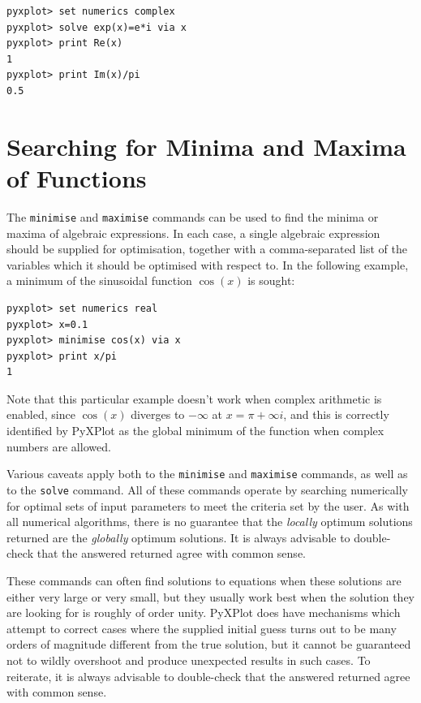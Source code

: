 \begin{verbatim}
pyxplot> set numerics complex
pyxplot> solve exp(x)=e*i via x
pyxplot> print Re(x)
1
pyxplot> print Im(x)/pi
0.5
\end{verbatim}

\section{Searching for Minima and Maxima of Functions}

The  {\tt minimise} and {\tt maximise}
commands can be used to find the minima or maxima of algebraic expressions. In
each case, a single algebraic expression should be supplied for optimisation,
together with a comma-separated list of the variables which it should be
optimised with respect to. In the following example, a minimum of the
sinusoidal function $\cos(x)$ is sought:

\begin{verbatim}
pyxplot> set numerics real
pyxplot> x=0.1
pyxplot> minimise cos(x) via x
pyxplot> print x/pi
1
\end{verbatim}

\noindent Note that this particular example doesn't work when complex
arithmetic is enabled, since $\cos(x)$ diverges to $-\infty$ at $x=\pi+\infty
i$, and this is correctly identified by PyXPlot as the global minimum of the
function when complex numbers are allowed.

Various caveats apply both to the {\tt minimise} and {\tt maximise} commands,
as well as to the {\tt solve} command.  All of these commands operate by
searching numerically for optimal sets of input parameters to meet the criteria
set by the user. As with all numerical algorithms, there is no guarantee that
the {\it locally} optimum solutions returned are the {\it globally} optimum
solutions. It is always advisable to double-check that the answered returned
agree with common sense.

These commands can often find solutions to equations when these solutions are
either very large or very small, but they usually work best when the solution
they are looking for is roughly of order unity.  PyXPlot does have mechanisms
which attempt to correct cases where the supplied initial guess turns out to be
many orders of magnitude different from the true solution, but it cannot be
guaranteed not to wildly overshoot and produce unexpected results in such
cases.  To reiterate, it is always advisable to double-check that the answered
returned agree with common sense.

